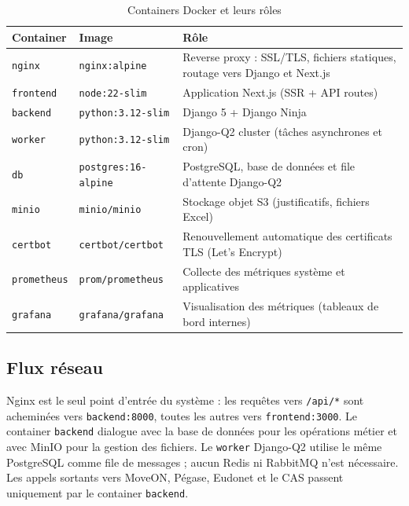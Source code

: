 \begin{table}[H]
\centering
\caption{Containers Docker et leurs rôles}
\label{tab:docker-containers}
\small
\renewcommand{\arraystretch}{1.4}
\begin{tabular}{|p{3cm}|p{4cm}|p{6.5cm}|}
\hline
\rowcolor{gray!20}
\textbf{Container} & \textbf{Image} & \textbf{Rôle} \\
\hline
\texttt{nginx} & \texttt{nginx:alpine} & Reverse proxy : SSL/TLS, fichiers statiques, routage vers Django et Next.js \\
\hline
\texttt{frontend} & \texttt{node:22-slim} & Application Next.js (SSR + API routes) \\
\hline
\texttt{backend} & \texttt{python:3.12-slim} & Django 5 + Django Ninja \\
\hline
\texttt{worker} & \texttt{python:3.12-slim} & Django-Q2 cluster (tâches asynchrones et cron) \\
\hline
\texttt{db} & \texttt{postgres:16-alpine} & PostgreSQL, base de données et file d'attente Django-Q2 \\
\hline
\texttt{minio} & \texttt{minio/minio} & Stockage objet S3 (justificatifs, fichiers Excel) \\
\hline
\texttt{certbot} & \texttt{certbot/certbot} & Renouvellement automatique des certificats TLS (Let's Encrypt) \\
\hline
\texttt{prometheus} & \texttt{prom/prometheus} & Collecte des métriques système et applicatives \\
\hline
\texttt{grafana} & \texttt{grafana/grafana} & Visualisation des métriques (tableaux de bord internes) \\
\hline
\end{tabular}
\end{table}

\subsection{Flux réseau}

Nginx est le seul point d'entrée du système : les requêtes vers \texttt{/api/*} sont acheminées vers \texttt{backend:8000}, toutes les autres vers \texttt{frontend:3000}. Le container \texttt{backend} dialogue avec la base de données pour les opérations métier et avec MinIO pour la gestion des fichiers. Le \texttt{worker} Django-Q2 utilise le même PostgreSQL comme file de messages ; aucun Redis ni RabbitMQ n'est nécessaire. Les appels sortants vers MoveON, Pégase, Eudonet et le CAS passent uniquement par le container \texttt{backend}.

